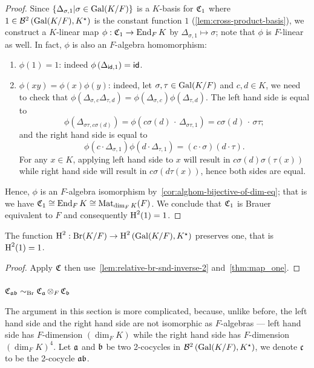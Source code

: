 \begin{proof}
  Since $\{\Delta_{\sigma, 1}|\sigma\in\operatorname{Gal}(K/F)\}$ is a $K$-basis for $\operatorname{\mathfrak{C}}_{1}$ where $1 \in \mathcal{B}^{2}\left(\operatorname{Gal}(K/F),K^{\star}\right)$ is the constant function $1$ (\cref{lem:cross-product-basis}), we construct a $K$-linear map $\phi : \operatorname{\mathfrak{C}}_{1} \to \operatorname{End}_{F} K$ by $\Delta_{\sigma, 1} \mapsto \sigma$; note that $\phi$ is $F$-linear as well. In fact, $\phi$ is also an $F$-algebra homomorphism:
  \begin{enumerate}
    \item $\phi(1) = 1$: indeed $\phi\left(\Delta_{\mathsf{id},1}\right) = \mathsf{id}$.
    \item $\phi(xy) = \phi(x)\phi(y)$: indeed, let $\sigma,\tau\in\operatorname{Gal}(K/F)$ and $c,d\in K$, we need to check that $\phi\left(\Delta_{\sigma,c}\Delta_{\tau,d}\right) = \phi\left(\Delta_{\sigma,c}\right)\phi\left(\Delta_{\tau,d}\right)$. The left hand side is equal to
          \[\phi\left(\Delta_{\sigma\tau,c\sigma(d)}\right) = \phi\left(c\sigma(d)\,\cdot\, \Delta_{\sigma\tau,1}\right) = c\sigma(d)\,\cdot\, \sigma\tau;\]
          and the right hand side is equal to
          \[
        \phi\left(c\cdot \Delta_{\sigma,1}\right)\phi\left(d\cdot \Delta_{\tau, 1}\right) = (c \cdot \sigma) (d \cdot \tau).
          \]
          For any $x \in K$, applying left hand side to $x$ will result in $c\sigma(d)\sigma(\tau(x))$ while right hand side will result in $c\sigma(d\tau(x))$, hence both sides are equal.
  \end{enumerate}
  Hence, $\phi$ is an $F$-algebra isomorphism by~\cref{cor:alghom-bijective-of-dim-eq}; that is we have $\operatorname{\mathfrak{C}}_{1} \cong \operatorname{End}_{F}K \cong\operatorname{Mat}_{\dim_{F}K}(F)$. We conclude that $\operatorname{\mathfrak{C}}_{1}$ is Brauer equivalent to $F$ and consequently $\operatorname{H}^{2}(1) = 1$.
\end{proof}


\begin{corollary}
  The function $\operatorname{H}^{2}:\operatorname{Br}(K/F) \to \operatorname{H}^{2}\left(\operatorname{Gal}(K/F), K^{\star}\right)$ preserves one, that is $\operatorname{H}^{2}(1) = 1$.
  \leanok
\end{corollary}
\begin{proof}
  Apply $\operatorname{\mathfrak{C}}$ then use~\cref{lem:relative-br-snd-inverse-2} and~\cref{thm:map_one}.
\end{proof}

\subsubsection{$\operatorname{\mathfrak{C}}_{\mathfrak{a}\mathfrak{b}}\sim_{\operatorname{Br}}\operatorname{\mathfrak{C}}_{\mathfrak{a}}\otimes_{F}\operatorname{\mathfrak{C}}_{\mathfrak{b}}$}
The argument in this section is more complicated, because, unlike before, the left hand side and the right hand side are not isomorphic as $F$-algebras --- left hand side has $F$-dimension $\left(\dim_{F}K\right)$ while the right hand side has $F$-dimension $\left(\dim_{F}K\right)^{4}$. Let $\mathfrak{a}$ and $\mathfrak{b}$ be two 2-cocycles in $\mathcal{B}^{2}\left(\operatorname{Gal}(K/F), K^{\star}\right)$, we denote $\mathfrak{c}$ to be the 2-cocycle $\mathfrak{a} \mathfrak{b}$.

